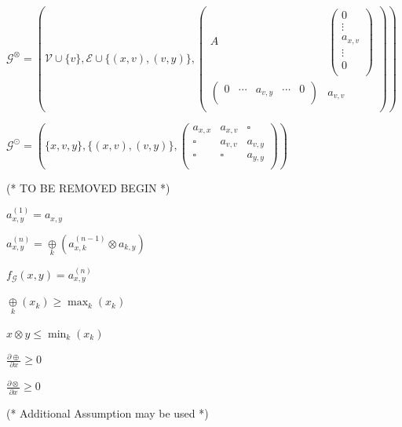 \documentclass{article}
\begin{document}
\(\mathcal{G}^{\otimes }=\left(\mathcal{V}\cup \{v\},\mathcal{E}\cup \{(x,v),(v,y)\},\left(
\begin{array}{cc}
 A & \left(
\begin{array}{c}
 0 \\
 \vdots \\
a_{x,v} \\
 \vdots \\
0 \\
\end{array}
\right) \\
 \left(
\begin{array}{ccccc}
 0 & \cdots  & a_{v,y} & \cdots  & 0 \\
\end{array}
\right) & a_{v,v} \\
\end{array}
\right)\right)\)

\(\mathcal{G}^{\odot }=\left(\{x,v,y\},\{(x,v),(v,y)\},\left(
\begin{array}{ccc}
 a_{x,x} & a_{x,v} & \square  \\
 \square  & a_{v,v} & a_{v,y} \\
 \square  & \square  & a_{y,y} \\
\end{array}
\right)\right)\)



(* TO BE REMOVED BEGIN *)


\item \(a_{x,y}^{(1)}=a_{x,y}\)


\item \(a_{x,y}^{(n)}=\underset{k}{\oplus }\left(a_{x,k}^{(n-1)}\otimes a_{k,y}\right)\)


\item \(f_{\mathcal{G}}(x,y)=a_{x,y}^{(n)}\)


\item \(\underset{k}{\oplus }\left(x_k\right)\geqslant \max _k\left(x_k\right)\)


\item \(x\otimes y\leqslant \min _k\left(x_k\right)\)


\item \(\frac{\partial \oplus }{\partial x}\geqslant 0\)


\item \(\frac{\partial \otimes }{\partial x}\geqslant 0\)



(* Additional Assumption may be used *)
\end{document}
